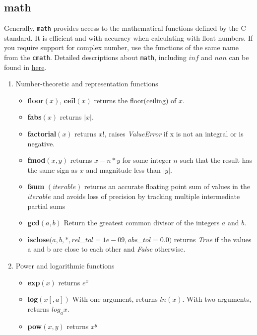 \subsection{math}
Generally, \texttt{math} provides access to the mathematical functions defined by the C standard. It is efficient and with accuracy when calculating with float numbers. If you require support for complex number, use the functions of the same name from the \texttt{cmath}. Detailed descriptions about \texttt{math}, including $inf$ and $nan$ can be found in \href{https://pymotw.com/3/math/index.html#module-math}{here}.
\begin{enumerate}
\item Number-theoretic and representation functions
\begin{itemize}
\item \textbf{floor}$(x)$, \textbf{ceil}$(x)$ returns the floor(ceiling) of $x$.
\item \textbf{fabs}$(x)$ returns $|x|$.
\item \textbf{factorial}$(x)$ returns $x!$, raises \textit{ValueError} if x is not an integral or is negative.
\item \textbf{fmod}$(x,y)$ returns  $x - n*y$ for some integer $n$ such that the result has the same sign as $x$ and magnitude less than $|y|$.
\item \textbf{fsum} $(iterable)$ returns an accurate floating point sum of values in the $iterable$ and avoids loss of precision by tracking multiple intermediate partial sums
\item \textbf{gcd}$(a,b)$ Return the greatest common divisor of the integers $a$ and $b$.
\item \textbf{isclose}$(a,b,*,rel$\_$tol=1e-09, abs$\_$tol=0.0)$ returns \textit{True} if the values a and b are close to each other and \textit{False} otherwise.
\end{itemize}

\item Power and logarithmic functions
\begin{itemize}
\item \textbf{exp}$(x)$ returns $e^x$
\item \textbf{log}$(x[, a])$ With one argument, returns $ln(x)$. With two arguments, returns $log_ax$.
\item \textbf{pow}$(x,y)$ returns $x^y$
\end{itemize}


\end{enumerate}
